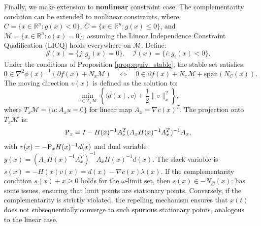 \documentclass[11pt]{article}
\newcommand{\R}{\mathbb R}
\newcommand{\cI}{\mathcal I}
\newcommand{\cM}{\mathcal M}
\newcommand{\cS}{\mathcal S}
\def\norm#1{\left\|#1\right\|}
\def\inner#1{\left\langle#1\right\rangle}
\begin{document}
Finally, we make extension to \textbf{nonlinear} constraint case. The complementarity condition can be extended to nonlinear constraints, where $C = \{x \in \mathbb{R}^n : g(x) < 0\}$, $\overline{C} = \{x \in \mathbb{R}^n : g(x) \leq 0\}$, and $\mathcal{M} = \{x \in \mathbb{R}^n : c(x) = 0\}$, assuming the Linear Independence Constraint Qualification (LICQ) holds everywhere on $\mathcal{M}$. Define:
$$\mathcal{J}(x) = \{j : g_j(x) = 0\}, \quad \mathcal{I}(x) = \{i : g_i(x) < 0\}.$$
Under the conditions of Proposition \ref{prop:equiv_stable}, the stable set satisfies:
$$0 \in \nabla^2 \phi(x)^{-1} (\partial f(x) + N_x \mathcal{M}) \quad \Longleftrightarrow \quad 0 \in \partial f(x) + N_x \mathcal{M} + \text{span}(N_C(x)).$$
The moving direction $v(x)$ is defined as the solution to:
$$\min_{v \in T_x \mathcal{M}} \left\{ \langle d(x), v \rangle + \frac{1}{2} \|v\|_x^2 \right\},$$
where $T_x \mathcal{M} = \{u : A_x u = 0\}$ for linear map $A_x=\nabla c(x)^T$. The projection onto $T_x \mathcal{M}$ is:
$${\rm P}_x = I - H(x)^{-1} A_x^T (A_x H(x)^{-1} A_x^T)^{-1} A_x,$$
with $v(x) = -{\rm P}_x H(x)^{-1} d(x)$ and dual variable $y(x) = (A_x H(x)^{-1} A_x^T)^{-1} A_x H(x)^{-1} d(x)$. The slack variable is $s(x) = -H(x) v(x) = d(x) - \nabla c(x) \lambda(x)$. {If the complementarity condition $s(x) + x \geq 0$ holds for the $\omega$-limit set, then $s(x) \in -N_{\overline{C}}(x)$: has some issues}, ensuring that limit points are stationary points. Conversely, if the complementarity is strictly violated, the repelling mechanism ensures that $x(t)$ does not subsequentially converge to such spurious stationary points, analogous to the linear case.
\end{document}
